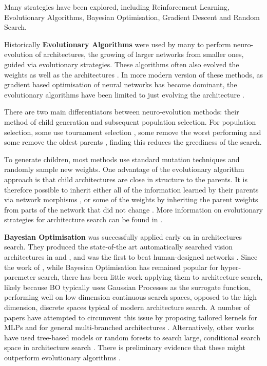 Many strategies have been explored, including Reinforcement Learning, Evolutionary Algorithms, Bayesian Optimisation, Gradient Descent and Random Search. 

Historically \textbf{Evolutionary Algorithms} were used by many to perform neuro-evolution of architectures, the growing of larger networks from smaller ones, guided via evolutionary strategies. These algorithms often also evolved the weights as well as the architectures \citep{Jozefowicz2015,Stanley2018,Floreano2008,Stanley2018a,PeterAngeline1994}. In more modern version of these methods, as gradient based optimisation of neural networks has become dominant, the evolutionary algorithms have been limited to just evolving the architecture \citep{Real,real2017large,Suganuma,liu2018progressive,miikkulainen2019evolving,Xie2018,Elsken2018}.

There are two main differentiators between neuro-evolution methods: their method of child generation and subsequent population selection. For population selection, some use tournament selection \citep{Real,real2017large, liu2018progressive}, some remove the worst performing \citep{real2017large} and some remove the oldest parents \citep{Real}, finding this reduces the greediness of the search. 

To generate children, most methods use standard mutation techniques and randomly sample new weights. One advantage of the evolutionary algorithm approach is that child architectures are close in structure to the parents. It is therefore possible to inherit either all of the information learned by their parents \citep{Elsken2018} via network morphisms \citep{Wei}, or some of the weights by inheriting the parent weights from parts of the network that did not change \citep{real2017large}. More information on evolutionary strategies for architecture search can be found in \citep{Stanley2018}.

\textbf{Bayesian Optimisation} was successfully applied early on in architectures search. They produced the state-of-the art automatically searched vision architectures in \citet{bergstra2013making} and \citet{Domhan2015}, and was the first to beat human-designed networks \citep{mendoza2016towards}. Since the work of \citet{zoph2016neural}, while Bayesian Optimisation has remained popular for hyper-paremeter search, there has been little work applying them to architecture search, likely because BO typically uses Gaussian Processes as the surrogate function, performing well on low dimension continuous search spaces, opposed to the high dimension, discrete spaces typical of modern architecture search. A number of papers have attempted to circumvent this issue by proposing tailored kernels for MLPs \citep{swersky2014raiders} and for general multi-branched architectures \citep{kandasamy2018neural}. Alternatively, other works have used tree-based models \citep{Bergstra} or random forests \citep{Hutter2018} to search large, conditional search space in architecture search \citep{bergstra2013making,mendoza2016towards}. There is preliminary evidence that these might outperform evolutionary algorithms \citep{Klein2016}.

